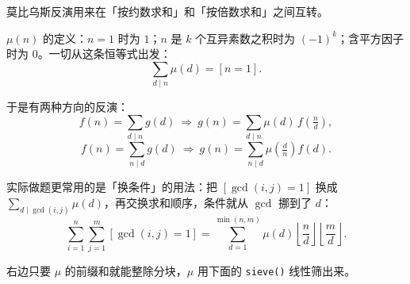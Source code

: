 莫比乌斯反演用来在「按约数求和」和「按倍数求和」之间互转。

$\mu(n)$ 的定义：$n=1$ 时为 $1$；$n$ 是 $k$ 个互异素数之积时为 $(-1)^k$；含平方因子时为 $0$。一切从这条恒等式出发：
\[ \sum_{d\mid n}\mu(d)=[n=1]. \]

于是有两种方向的反演：
\[
f(n)=\sum_{d\mid n}g(d)\ \Longrightarrow\ g(n)=\sum_{d\mid n}\mu(d)\,f\!\left(\tfrac nd\right),
\]
\[
f(n)=\sum_{n\mid d}g(d)\ \Longrightarrow\ g(n)=\sum_{n\mid d}\mu\!\left(\tfrac dn\right)f(d).
\]

实际做题更常用的是「换条件」的用法：把 $[\gcd(i,j)=1]$ 换成 $\sum_{d\mid\gcd(i,j)}\mu(d)$，再交换求和顺序，条件就从 $\gcd$ 挪到了 $d$：
\[
\sum_{i=1}^{n}\sum_{j=1}^{m}[\gcd(i,j)=1]=\sum_{d=1}^{\min(n,m)}\mu(d)\left\lfloor\frac nd\right\rfloor\left\lfloor\frac md\right\rfloor .
\]

右边只要 $\mu$ 的前缀和就能整除分块，$\mu$ 用下面的 \texttt{sieve()} 线性筛出来。
